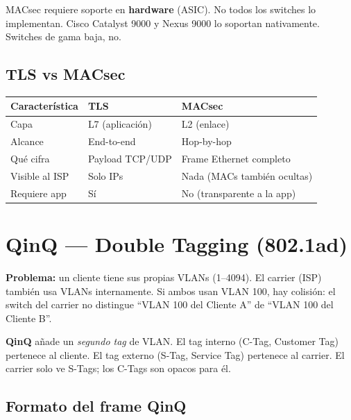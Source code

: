 \begin{cuidado}
MACsec requiere soporte en \textbf{hardware} (ASIC). No todos los switches lo implementan.
Cisco Catalyst 9000 y Nexus 9000 lo soportan nativamente. Switches de gama baja, no.
\end{cuidado}

\subsection{TLS vs MACsec}

\begin{center}
\begin{tabular}{lll}
\toprule
\textbf{Característica} & \textbf{TLS} & \textbf{MACsec} \\
\midrule
Capa           & L7 (aplicación)   & L2 (enlace) \\
Alcance        & End-to-end        & Hop-by-hop \\
Qué cifra      & Payload TCP/UDP   & Frame Ethernet completo \\
Visible al ISP & Solo IPs          & Nada (MACs también ocultas) \\
Requiere app   & Sí                & No (transparente a la app) \\
\bottomrule
\end{tabular}
\end{center}

\section{ QinQ --- Double Tagging (802.1ad)}

\begin{concepto}
\textbf{Problema:} un cliente tiene sus propias VLANs (1--4094). El carrier (ISP) también
usa VLANs internamente. Si ambos usan VLAN 100, hay colisión: el switch del carrier
no distingue ``VLAN 100 del Cliente A'' de ``VLAN 100 del Cliente B''.

\textbf{QinQ} añade un \emph{segundo tag} de VLAN. El tag interno (C-Tag, Customer Tag)
pertenece al cliente. El tag externo (S-Tag, Service Tag) pertenece al carrier.
El carrier solo ve S-Tags; los C-Tags son opacos para él.
\end{concepto}

\subsection{Formato del frame QinQ}

